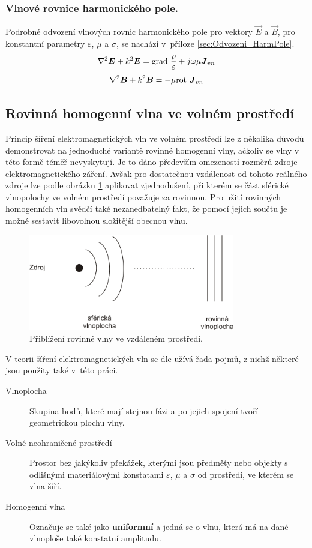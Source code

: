 \subsubsection*{Vlnové rovnice harmonického pole.}
 Podrobné odvození vlnových rovnic harmonického pole pro vektory $\vec E$ a $\vec B$, pro konstantní parametry $\varepsilon$, $\mu$ a $\sigma$, se nachází v~příloze \ref{sec:Odvozeni_HarmPole}.
\begin{equation}
	\nabla^{2}\mbox{\boldmath$E$} +k^{2}\mbox{\boldmath$E$} = \mathrm{grad}\ \frac{\rho}{\varepsilon}+ j\omega\mu\mbox{\boldmath$J$}_{vn}
	\label{rce:evlny_VlnR_ElPole_harm} 
\end{equation}
\begin{equation}
	\nabla^{2}\mbox{\boldmath$B$} +k^{2}\mbox{\boldmath$B$} = -\mu\mathrm{rot}\ \mbox{\boldmath$J$}_{vn}
	\label{rce:evlny_VlnR_MagPole_harm} 
\end{equation}

\subsection{Rovinná homogenní vlna ve volném prostředí}
Princip šíření elektromagnetických vln ve volném prostředí lze z několika důvodů demonstrovat na jednoduché variantě rovinné homogenní vlny, ačkoliv se vlny v této formě téměř nevyskytují. Je to dáno především omezeností rozměrů zdroje elektromagnetického záření. Avšak pro dostatečnou vzdálenost od tohoto reálného zdroje lze podle obrázku \ref{obr:evlny_rovinna_vlna} aplikovat zjednodušení, při kterém se část sférické vlnopolochy ve volném prostředí považuje za rovinnou. Pro užití rovinných homogenních vln svědčí také nezanedbatelný fakt, že pomocí jejich součtu je možné sestavit libovolnou složitější obecnou vlnu. 

\begin{figure}[!h]
	\centering
	\includegraphics[width=9cm]{evlny_rovinna_vlna.png}
	\caption{Přiblížení rovinné vlny ve vzdáleném prostředí.}
	\label{obr:evlny_rovinna_vlna}
\end{figure}

V teorii šíření elektromagnetických vln se dle \cite{emp} užívá řada pojmů, z nichž některé jsou použity také v~této práci.
\begin{description}
\item[Vlnoplocha] Skupina bodů, které mají stejnou fázi a po jejich spojení tvoří geometrickou plochu vlny.
\item[Volné neohraničené prostředí] Prostor bez jakýkoliv překážek, kterými jsou předměty nebo objekty s odlišnými materiálovými konstatami  $\varepsilon$, $\mu$ a $\sigma$ od prostředí, ve kterém se vlna šíří.
\item[Homogenní vlna] Označuje se také jako {\bf uniformní} a jedná se o vlnu, která má na dané vlnoploše také konstatní amplitudu.
\end{description}

